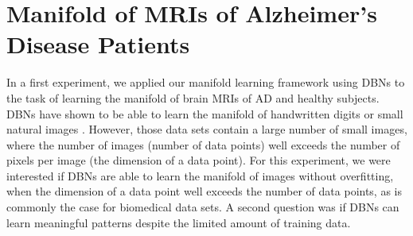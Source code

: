


\section[Manifold of MRIs of Alzheimer's disease patients]{Manifold of MRIs of
Alzheimer's Disease Patients}


In a first experiment, we applied our manifold learning framework using DBNs to
the task of learning the manifold of brain MRIs of AD and healthy subjects. DBNs
have shown to be able to learn the manifold of handwritten digits
\citep{hinton2006b} or small natural images \citep{krizhevsky2010}. However,
those data sets contain a large number of small images, where the number of
images (number of data points) well exceeds the number of pixels per image (the
dimension of a data point). For this experiment, we were interested if DBNs are
able to learn the manifold of images without overfitting, when the dimension of
a data point well exceeds the number of data points, as is commonly the case for
biomedical data sets. A second question was if DBNs can learn meaningful
patterns despite the limited amount of training data.



